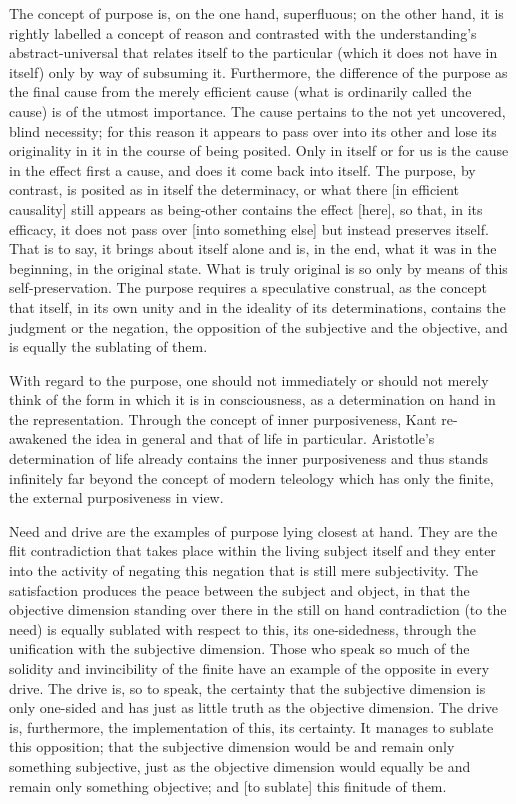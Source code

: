 The concept of purpose is, on the one hand, superfluous;
on the other hand, it is rightly labelled a concept of reason and
contrasted with the understanding's abstract-universal that
relates itself to the particular (which it does not have in itself)
only by way of subsuming it.
Furthermore, the difference of the purpose as the final cause
from the merely efficient cause (what is ordinarily called the cause)
is of the utmost importance.
The cause pertains to the not yet uncovered, blind necessity;
for this reason it appears to pass over into its other and
lose its originality in it in the course of being posited.
Only in itself or for us is the cause in the effect first a cause,
and does it come back into itself.
The purpose, by contrast, is posited as in itself the determinacy,
or what there [in efficient causality] still appears as being-other
contains the effect [here], so that, in its efficacy,
it does not pass over [into something else] but instead preserves itself.
That is to say, it brings about itself alone and is, in the end,
what it was in the beginning, in the original state.
What is truly original is so only by means of this self-preservation.
The purpose requires a speculative construal, as the concept that itself,
in its own unity and in the ideality of its determinations,
contains the judgment or the negation,
the opposition of the subjective and the objective,
and is equally the sublating of them.

With regard to the purpose, one should not immediately or
should not merely think of the form in which it is in consciousness,
as a determination on hand in the representation.
Through the concept of inner purposiveness,
Kant re-awakened the idea in general and that of life in particular.
Aristotle's determination of life already contains the inner purposiveness and
thus stands infinitely far beyond the concept of modern teleology
which has only the finite, the external purposiveness in view.

Need and drive are the examples of purpose lying closest at hand.
They are the flit contradiction that takes place within the living
subject itself and they enter into the activity of negating this
negation that is still mere subjectivity.
The satisfaction produces the peace between the subject and object,
in that the objective dimension standing over there in the still on hand
contradiction (to the need) is equally sublated with respect to this,
its one-sidedness, through the unification with the subjective dimension.
Those who speak so much of the solidity and invincibility of
the finite have an example of the opposite in every drive.
The drive is, so to speak, the certainty that the subjective dimension
is only one-sided and has just as little truth as the objective dimension.
The drive is, furthermore, the implementation of this, its certainty.
It manages to sublate this opposition;
that the subjective dimension would be and remain only something subjective,
just as the objective dimension would equally be and remain only something objective;
and [to sublate] this finitude of them.

